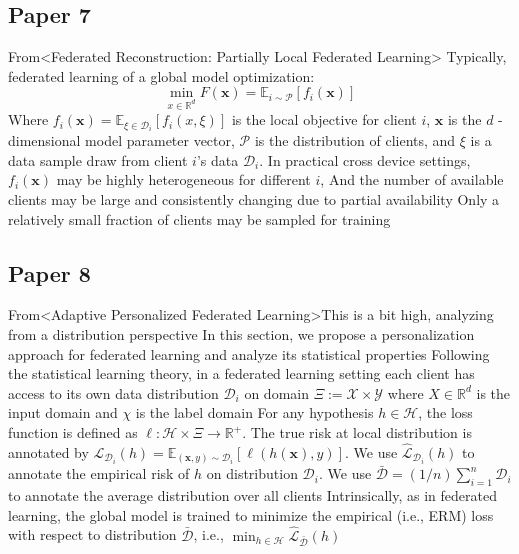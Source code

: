 \subsection{Paper 7}
From<Federated Reconstruction: Partially Local Federated Learning>
Typically, federated learning of a global model optimization:
\begin{equation*}
    \min_{x\in\mathbb{R}^d}F(\mathbf{x})=\mathbb{E}_{i\sim \mathcal{P}}[f_i(\mathbf{x})]
\end{equation*}
Where $f_i(\mathbf{x})=\mathbb{E}_{\xi\in\mathcal{D}_i}[f_i(x,\xi)]$ is the local objective for client $i$, $\mathbf{x}$ is the $d$ - dimensional model parameter vector, $\mathcal{P}$ is the distribution of clients, and $\xi$ is a data sample draw from client $i$'s data $\mathcal{D}_i$. In practical cross device settings, $f_i(\mathbf{x})$ may be highly heterogeneous for different $i$, And the number of available clients may be large and consistently changing due to partial availability Only a relatively small fraction of clients may be sampled for training
\subsection{Paper 8}
From<Adaptive Personalized Federated Learning>This is a bit high, analyzing from a distribution perspective
In this section, we propose a personalization approach for federated learning and analyze its statistical properties
Following the statistical learning theory, in a federated learning setting each client has access to its own data distribution $\mathcal{D}_i$ on domain $\Xi:=\mathcal{X}\times\mathcal{Y}$ where $X\in\mathbb{R}^d$ is the input domain and $\chi$ is the label domain For any hypothesis $h\in\mathcal{H}$, the loss function is defined as $\ell:\mathcal{H}\times\Xi\to\mathbb{R}^+$. The true risk at local distribution is annotated by $\mathcal{L}_{\mathcal{D}_i}(h)=\mathbb{E}_{(\boldsymbol{x},y)\sim\mathcal{D}_i}\left[\ell\left(h(\boldsymbol{x}),y\right)\right]$. We use $\hat{\mathcal{L}}_{\mathcal{D}_i}(h)$ to annotate the empirical risk of $h$ on distribution $\mathcal{D}_i$. We use $\bar{\mathcal{D}}=(1/n)\sum_{i=1}^n\mathcal{D}_i$ to annotate the average distribution over all clients Intrinsically, as in federated learning, the global model is trained to minimize the empirical (i.e., ERM) loss with respect to distribution $\bar{\mathcal{D}}$, i.e., $\min_{h\in\mathcal{H}}\hat{\mathcal{L}}_{\bar{\mathcal{D}}}(h)$
